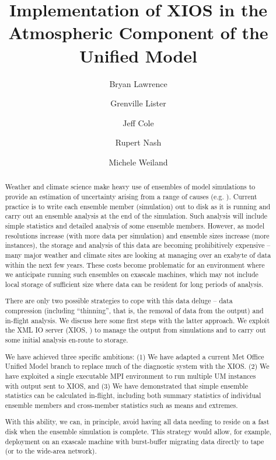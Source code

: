 \documentclass[twocolumn, 5p, times]{elsarticle}
\begin{document}
\title{Implementation of XIOS in the Atmospheric Component of the Unified Model}

\author[ncas,met,comp]{Bryan Lawrence}
\author[ncas,met]{Grenville Lister}
\author[ncas,met]{Jeff Cole}
\author[epcc]{Rupert Nash}
\author[epcc]{Michele Weiland}
\address[ncas]{National Centre for Atmospheric Science, UK}
\address[met]{Department of Meteorology, University of Reading, UK}
\address[comp]{Department of Computer Science, University of Reading, UK}
\address[epcc]{EPCC, The University of Edinburgh, UK}

\begin{abstract}
Weather and climate science make heavy use of ensembles of model simulations to provide an estimation of uncertainty arising from a range of causes (e.g. \cite{HawSut09}). Current practice is to write each ensemble member (simulation) out to disk as it is running and carry out an ensemble analysis at the end of the simulation. Such analysis will include simple statistics and detailed analysis of some ensemble members. However, as model resolutions increase (with more data per simulation) and ensemble sizes increase (more instances), the storage and analysis of this data are becoming prohibitively expensive -- many major weather and climate sites are looking at managing over an exabyte of data within the next few years. These costs become problematic for an environment where we anticipate running such ensembles on exascale machines, which may not include local storage of sufficient size where data can be resident for long periods of analysis.

There are only two possible strategies to cope with this data deluge -- data compression (including ``thinning'', that is, the removal of data from the output) and in-flight analysis. We discuss here some first steps with the latter approach. We exploit the XML IO server (XIOS, \cite{XIOS12}) to manage the output from simulations and to carry out some initial analysis en-route to storage.  

We have achieved three specific ambitions: (1) We have adapted a current Met Office Unified Model branch to replace much of the diagnostic system with the XIOS.
(2) We have exploited a single executable MPI environment to run multiple UM instances with output sent to XIOS, and (3) We have demonstrated that simple ensemble statistics can be calculated in-flight, including both summary statistics of individual ensemble members and cross-member statistics such as means and extremes.

With this ability, we can, in principle, avoid having all data needing to reside on a fast disk when the ensemble simulation is complete. This strategy would allow, for example, deployment on an exascale machine with burst-buffer migrating data directly to tape (or to the wide-area network). 


\end{abstract}
\end{document}
